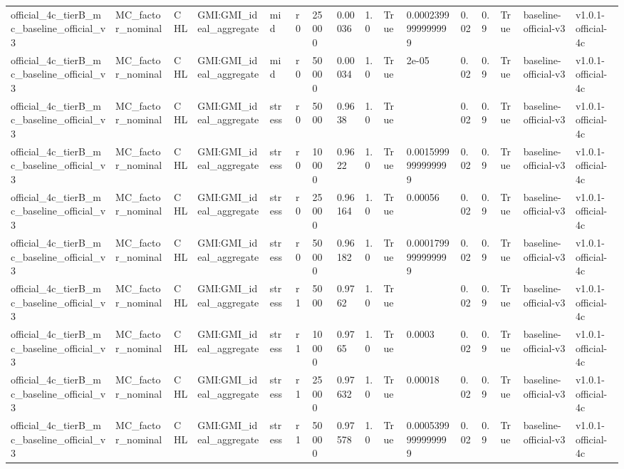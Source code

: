 \begin{table}[!htbp]
\begin{tabular}{llllllllllllllll}
official\_4c\_tierB\_mc\_baseline\_official\_v3 & MC\_factor\_nominal & CHL & GMI:GMI\_ideal\_aggregate & mid & r0 & 25000 & 0.00036 & 1.0 & True & 0.0002399999999999 & 0.02 & 0.9 & True & baseline-official-v3 & v1.0.1-official-4c \\
official\_4c\_tierB\_mc\_baseline\_official\_v3 & MC\_factor\_nominal & CHL & GMI:GMI\_ideal\_aggregate & mid & r0 & 50000 & 0.00034 & 1.0 & True & 2e-05 & 0.02 & 0.9 & True & baseline-official-v3 & v1.0.1-official-4c \\
official\_4c\_tierB\_mc\_baseline\_official\_v3 & MC\_factor\_nominal & CHL & GMI:GMI\_ideal\_aggregate & stress & r0 & 5000 & 0.9638 & 1.0 & True &  & 0.02 & 0.9 & True & baseline-official-v3 & v1.0.1-official-4c \\
official\_4c\_tierB\_mc\_baseline\_official\_v3 & MC\_factor\_nominal & CHL & GMI:GMI\_ideal\_aggregate & stress & r0 & 10000 & 0.9622 & 1.0 & True & 0.0015999999999999 & 0.02 & 0.9 & True & baseline-official-v3 & v1.0.1-official-4c \\
official\_4c\_tierB\_mc\_baseline\_official\_v3 & MC\_factor\_nominal & CHL & GMI:GMI\_ideal\_aggregate & stress & r0 & 25000 & 0.96164 & 1.0 & True & 0.00056 & 0.02 & 0.9 & True & baseline-official-v3 & v1.0.1-official-4c \\
official\_4c\_tierB\_mc\_baseline\_official\_v3 & MC\_factor\_nominal & CHL & GMI:GMI\_ideal\_aggregate & stress & r0 & 50000 & 0.96182 & 1.0 & True & 0.0001799999999999 & 0.02 & 0.9 & True & baseline-official-v3 & v1.0.1-official-4c \\
official\_4c\_tierB\_mc\_baseline\_official\_v3 & MC\_factor\_nominal & CHL & GMI:GMI\_ideal\_aggregate & stress & r1 & 5000 & 0.9762 & 1.0 & True &  & 0.02 & 0.9 & True & baseline-official-v3 & v1.0.1-official-4c \\
official\_4c\_tierB\_mc\_baseline\_official\_v3 & MC\_factor\_nominal & CHL & GMI:GMI\_ideal\_aggregate & stress & r1 & 10000 & 0.9765 & 1.0 & True & 0.0003 & 0.02 & 0.9 & True & baseline-official-v3 & v1.0.1-official-4c \\
official\_4c\_tierB\_mc\_baseline\_official\_v3 & MC\_factor\_nominal & CHL & GMI:GMI\_ideal\_aggregate & stress & r1 & 25000 & 0.97632 & 1.0 & True & 0.00018 & 0.02 & 0.9 & True & baseline-official-v3 & v1.0.1-official-4c \\
official\_4c\_tierB\_mc\_baseline\_official\_v3 & MC\_factor\_nominal & CHL & GMI:GMI\_ideal\_aggregate & stress & r1 & 50000 & 0.97578 & 1.0 & True & 0.0005399999999999 & 0.02 & 0.9 & True & baseline-official-v3 & v1.0.1-official-4c \\

\end{tabular}
\end{table}
